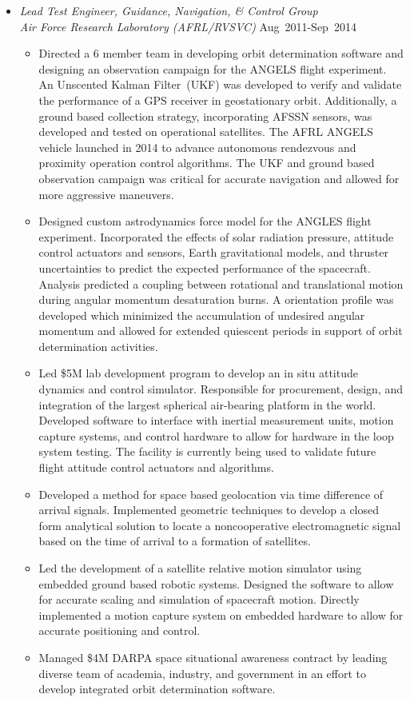 \begin{itemize}
\item[] \textit{Lead Test Engineer, Guidance, Navigation, \& Control Group \\
    Air Force Research Laboratory (AFRL/RVSVC)}%
    \hfill {Aug~2011-Sep~2014}
    \begin{itemize}
        \item Directed a 6 member team in developing orbit determination software and designing an observation campaign for the ANGELS flight experiment.
        An Unscented Kalman Filter~(UKF) was developed to verify and validate the performance of a GPS receiver in geostationary orbit.
        Additionally, a ground based collection strategy, incorporating AFSSN sensors, was developed and tested on operational satellites.
        The AFRL ANGELS vehicle launched in 2014 to advance autonomous rendezvous and proximity operation control algorithms.
        The UKF and ground based observation campaign was critical for accurate navigation and allowed for more aggressive maneuvers. 
        \item Designed custom astrodynamics force model for the ANGLES flight experiment.
        Incorporated the effects of solar radiation pressure, attitude control actuators and sensors, Earth gravitational models, and thruster uncertainties to predict the expected performance of the spacecraft.
        Analysis predicted a coupling between rotational and translational motion during angular momentum desaturation burns.
        A orientation profile was developed which minimized the accumulation of undesired angular momentum and allowed for extended quiescent periods in support of orbit determination activities.
        \item Led \$5M lab development program to develop an in situ attitude dynamics and control simulator.  
        Responsible for procurement, design, and integration of the largest spherical air-bearing platform in the world.
        Developed software to interface with inertial measurement units, motion capture systems, and control hardware to allow for hardware in the loop system testing.
        The facility is currently being used to validate future flight attitude control actuators and algorithms. 
        \item Developed a method for space based geolocation via time difference of arrival signals.
        Implemented geometric techniques to develop a closed form analytical solution to locate a noncooperative electromagnetic signal based on the time of arrival to a formation of satellites.
        \item Led the development of a satellite relative motion simulator using embedded ground based robotic systems.
        Designed the software to allow for accurate scaling and simulation of spacecraft motion.
        Directly implemented a motion capture system on embedded hardware to allow for accurate positioning and control. 
        \item Managed \$4M DARPA space situational awareness contract by leading diverse team of academia, industry, and government in an effort to develop integrated orbit determination software.
    \end{itemize}


\end{itemize}
